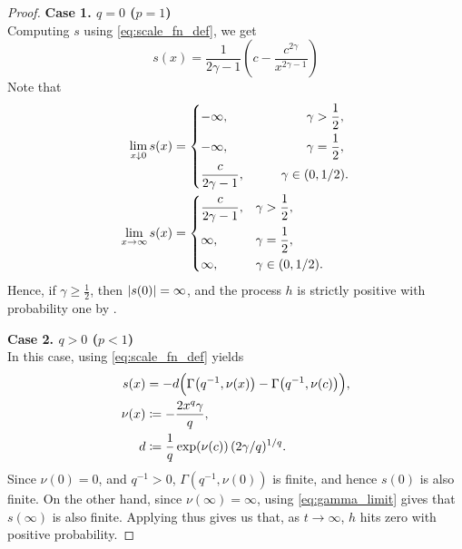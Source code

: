 \documentclass[twocolumn,amsthm]{autart}
\DeclarePairedDelimiter\abs{\lvert}{\rvert}
\newcommand{\lft}{\mathopen{}\mathclose\bgroup\left}
\newcommand{\rht}{\aftergroup\egroup\right}
\begin{document}
\begin{appendix}
\begin{proof}
\textbf{Case 1. $q=0$ ($p=1$)}\\
    Computing $s$ using \eqref{eq:scale_fn_def}, we get
    \begin{equation}
        s(x) = \frac{1}{2\gamma - 1} \left(c - \frac{c^{2\gamma}}{x^{2\gamma - 1}}  \right)
    \end{equation}
    Note that
    \begin{align}
        \lim_{x \downarrow 0} s(x) &= \begin{dcases}
            -\infty, &\qquad \gamma > \frac{1}{2}, \\
            -\infty, &\qquad \gamma = \frac{1}{2}, \\
            \frac{c}{2\gamma - 1}, \qquad &\gamma \in (0, 1/2).
        \end{dcases} \\
        \lim_{x \to \infty} s(x) &= \begin{dcases}
            \frac{c}{2\gamma - 1}, &\gamma > \frac{1}{2},  \\
            \infty, &\gamma = \frac{1}{2}, \\
            \infty, &\gamma \in (0, 1/2). \end{dcases}
    \end{align}
    Hence, if $\gamma \geq \frac{1}{2}$, then $\abs{s(0)} = \infty$, and the process $h$ is strictly positive with probability one by .

\textbf{Case 2. $q > 0$ ($p < 1$)}\\
    In this case, using \eqref{eq:scale_fn_def} yields
    \begin{align}
        s(x) &= -d \Big( \Gamma\lft( q^{-1}, \nu(x) \rht) - \Gamma\lft( q^{-1}, \nu(c) \rht) \Big), \\
        \nu(x) &\coloneqq -\frac{2 x^q \gamma}{q}, \\
        d &\coloneqq \frac{1}{q} \exp( \nu(c) )\, (2 \gamma / q)^{1/q}.
    \end{align}
    Since $\nu(0) = 0$, and $q^{-1} > 0$, $\Gamma(q^{-1}, \nu(0))$ is finite, and hence $s(0)$ is also finite. On the other hand, since $\nu(\infty) = \infty$, using \eqref{eq:gamma_limit} gives that $s(\infty)$ is also finite. Applying  thus gives us that, as $t \to \infty$, $h$ hits zero with positive probability.


\end{proof}
\end{appendix}
\end{document}
